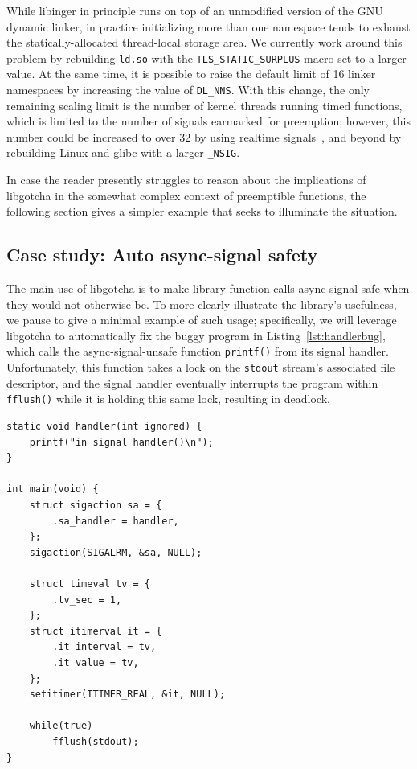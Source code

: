 \vspace{\parsep}
While libinger in principle runs on top of an unmodified version of the GNU dynamic
linker, in practice initializing more than one namespace tends to exhaust the
statically-allocated thread-local storage area.  We currently work around this
problem by rebuilding \texttt{ld.so} with the \texttt{TLS\_STATIC\_SURPLUS} macro set
to a larger value.  At the same time, it is possible to raise the default limit
of 16 linker namespaces by increasing the value of \texttt{DL\_NNS}.  With this
change, the only remaining scaling limit is the number of kernel threads running
timed functions, which is limited to the number of signals earmarked for preemption;
however, this number could be increased to over 32 by using realtime
signals~\cite{signal-manpage}, and beyond by rebuilding Linux and glibc with a larger
\texttt{\_NSIG}.

In case the reader presently struggles to reason about the implications of libgotcha
in the somewhat complex context of preemptible functions, the following section gives
a simpler example that seeks to illuminate the situation.

\subsection{Case study: Auto async-signal safety}
\label{sec:statefulness}

The main use of libgotcha is to make library function calls async-signal safe when
they would not otherwise be.  To more clearly illustrate the library's usefulness, we
pause to give a minimal example of such usage; specifically, we will leverage
libgotcha to automatically fix the buggy program in Listing~\ref{lst:handlerbug},
which calls the async-signal-unsafe function \texttt{printf()} from its signal
handler.  Unfortunately, this function takes a lock on the \texttt{stdout} stream's
associated file descriptor, and the signal handler eventually interrupts the program
within \texttt{fflush()} while it is holding this same lock, resulting in deadlock.

\begin{lstlisting}[label=lst:handlerbug,caption=C program with a buggy signal handler]
static void handler(int ignored) {
	printf("in signal handler()\n");
}

int main(void) {
	struct sigaction sa = {
		.sa_handler = handler,
	};
	sigaction(SIGALRM, &sa, NULL);

	struct timeval tv = {
		.tv_sec = 1,
	};
	struct itimerval it = {
		.it_interval = tv,
		.it_value = tv,
	};
	setitimer(ITIMER_REAL, &it, NULL);

	while(true)
		fflush(stdout);
}
\end{lstlisting}

